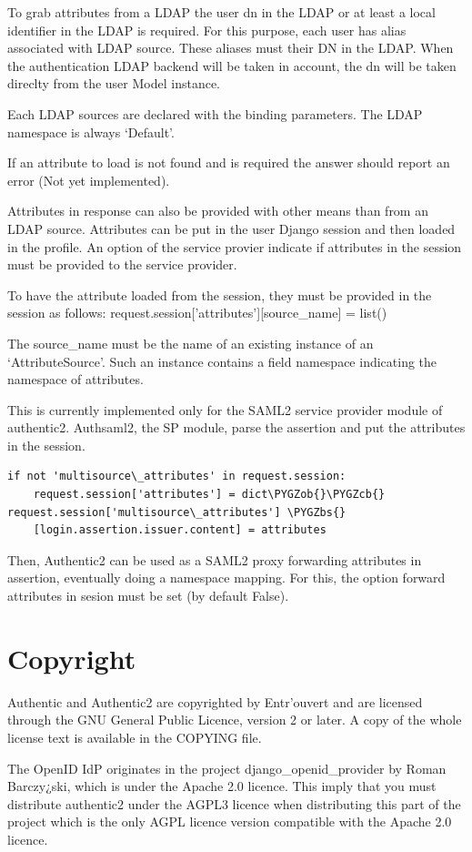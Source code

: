 \documentclass[letterpaper,10pt,english]{sphinxmanual}
\def\PYGZbs{\char`\\}
\def\PYGZob{\char`\{}
\def\PYGZcb{\char`\}}
\begin{document}
To grab attributes from a LDAP the user dn in the LDAP  or at least a local
identifier in the LDAP is required. For this purpose, each user has alias
associated with LDAP source. These aliases must their DN in the LDAP. When
the authentication LDAP backend will be taken in account, the dn will be taken
direclty from the user Model instance.

Each LDAP sources are declared with the binding parameters. The LDAP namespace
is always `Default'.

If an attribute to load is not found and is required the answer should report
an error (Not yet implemented).

Attributes in response can also be provided with other means than from an LDAP
source. Attributes can be put in the user Django session and then loaded in
the profile. An option of the service provier indicate if attributes in the
session must be provided to the service provider.

To have the attribute loaded from the session, they must be provided in the
session as follows:
request.session{[}'attributes'{]}{[}source\_name{]} = list()

The source\_name must be the name of an existing instance of an
`AttributeSource'. Such an instance contains a field namespace indicating the
namespace of attributes.

This is currently implemented only for the SAML2 service provider module of
authentic2. Authsaml2, the SP module, parse the assertion and put the
attributes in the session.

\begin{Verbatim}[commandchars=\\\{\}]
if not 'multisource\_attributes' in request.session:
    request.session['attributes'] = dict\PYGZob{}\PYGZcb{}
request.session['multisource\_attributes'] \PYGZbs{}
    [login.assertion.issuer.content] = attributes
\end{Verbatim}

Then, Authentic2 can be used as a SAML2 proxy forwarding attributes in
assertion, eventually doing a namespace mapping. For this, the option
forward attributes in sesion must be set (by default False).


\chapter{Copyright}
\label{index:copyright}
Authentic and Authentic2 are copyrighted by Entr'ouvert and are licensed through the GNU General
Public Licence, version 2 or later. A copy of the whole license text is available in the COPYING file.

The OpenID IdP originates in the project django\_openid\_provider by Roman
Barczy¿ski, which is under the Apache 2.0 licence. This imply that you must
distribute authentic2 under the AGPL3 licence when distributing this part of the
project which is the only AGPL licence version compatible with the Apache 2.0
licence.



\renewcommand{\indexname}{Index}
\printindex
\end{document}
